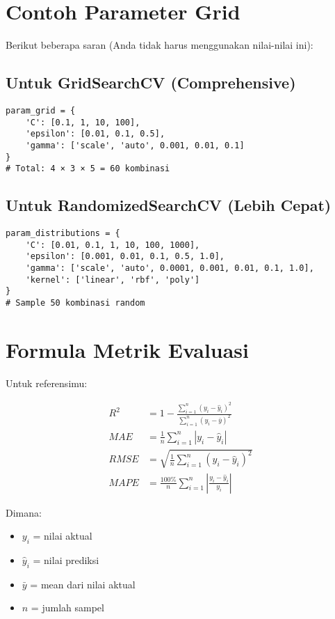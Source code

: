 \documentclass[12pt,a4paper]{article}
\begin{document}
\section{Contoh Parameter Grid}

Berikut beberapa saran (Anda tidak harus menggunakan nilai-nilai ini):

\subsection{Untuk GridSearchCV (Comprehensive)}
\begin{verbatim}
param_grid = {
    'C': [0.1, 1, 10, 100],
    'epsilon': [0.01, 0.1, 0.5],
    'gamma': ['scale', 'auto', 0.001, 0.01, 0.1]
}
# Total: 4 × 3 × 5 = 60 kombinasi
\end{verbatim}

\subsection{Untuk RandomizedSearchCV (Lebih Cepat)}
\begin{verbatim}
param_distributions = {
    'C': [0.01, 0.1, 1, 10, 100, 1000],
    'epsilon': [0.001, 0.01, 0.1, 0.5, 1.0],
    'gamma': ['scale', 'auto', 0.0001, 0.001, 0.01, 0.1, 1.0],
    'kernel': ['linear', 'rbf', 'poly']
}
# Sample 50 kombinasi random
\end{verbatim}

\section{Formula Metrik Evaluasi}

Untuk referensimu:

\begin{align}
R^2 &= 1 - \frac{\sum_{i=1}^{n}(y_i - \hat{y}_i)^2}{\sum_{i=1}^{n}(y_i - \bar{y})^2} \\
MAE &= \frac{1}{n}\sum_{i=1}^{n}|y_i - \hat{y}_i| \\
RMSE &= \sqrt{\frac{1}{n}\sum_{i=1}^{n}(y_i - \hat{y}_i)^2} \\
MAPE &= \frac{100\%}{n}\sum_{i=1}^{n}\left|\frac{y_i - \hat{y}_i}{y_i}\right|
\end{align}

Dimana:
\begin{itemize}
    \item $y_i$ = nilai aktual
    \item $\hat{y}_i$ = nilai prediksi
    \item $\bar{y}$ = mean dari nilai aktual
    \item $n$ = jumlah sampel
\end{itemize}
\end{document}
